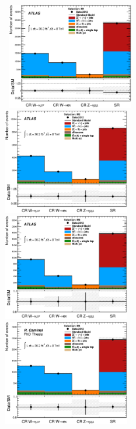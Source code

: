 \begin{figure}[!ht]
  \begin{center}
    \mbox{
      \includegraphics[width=0.495\textwidth]{MonojetAnalysis/Figures/regionsComposition_Stop_M1.eps}
      \includegraphics[width=0.495\textwidth]{MonojetAnalysis/Figures/regionsComposition_Stop_M2.eps}
    }
    \mbox{
      \includegraphics[width=0.495\textwidth]{MonojetAnalysis/Figures/regionsComposition_Stop_M3.eps}
      \includegraphics[width=0.495\textwidth]{MonojetAnalysis/Figures/regionsComposition_Stop_M4.eps}
}
\end{center}
\end{figure}
